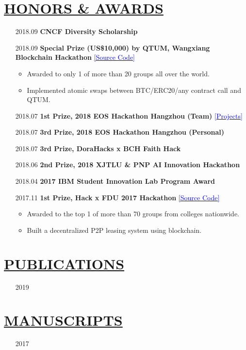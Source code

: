 \documentclass[11pt]{article}
\begin{document}
\section*{\centering\underline{HONORS \& AWARDS}}
\begin{itemize}[noitemsep, nolistsep]
    \item[2018.09]\textbf{CNCF Diversity Scholarship}
    \item[2018.09]\textbf{Special Prize (US\$10,000) by QTUM, Wangxiang Blockchain Hackathon} \href{https://github.com/PRIEWIENV/QtumSwap}{\textcolor{blue}{[Source Code]}}
        \begin{itemize}[noitemsep, nolistsep]
            \item Awarded to only 1 of more than 20 groups all over the world. 
            \item Implemented atomic swaps between BTC/ERC20/any contract call and QTUM.
        \end{itemize} 
    \item[2018.07]\textbf{1st Prize, 2018 EOS Hackathon Hangzhou (Team)} \href{https://github.com/Acappella-dream}{\textcolor{blue}{[Projects]}}
    \item[2018.07]\textbf{3rd Prize, 2018 EOS Hackathon Hangzhou (Personal)}
    \item[2018.07]\textbf{3rd Prize, DoraHacks x BCH Faith Hack}
    \item[2018.06]\textbf{2nd Prize, 2018 XJTLU \& PNP AI Innovation Hackathon}
    \item[2018.04]\textbf{2017 IBM Student Innovation Lab Program Award}
    \item[2017.11]\textbf{1st Prize, Hack x FDU 2017 Hackathon} \href{https://github.com/dexhunter/hackxfdu-DSharing}{\textcolor{blue}{[Source Code]}}
        \begin{itemize}[noitemsep, nolistsep]
            \item Awarded to the top 1 of more than 70 groups from colleges nationwide.
            \item Built a decentralized P2P leasing system using blockchain. 
        \end{itemize} 
\end{itemize}




\section*{\centering\underline{PUBLICATIONS}}
\begin{itemize}
    \item[2019] 
\end{itemize}
\section*{\centering\underline{MANUSCRIPTS}}
\begin{itemize}
    \item[2017] 
\end{itemize}
\end{document}
